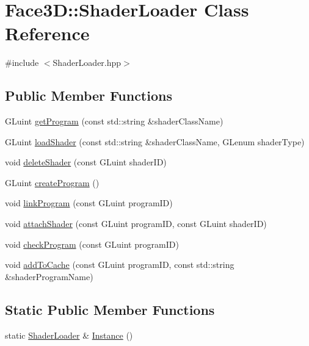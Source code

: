\hypertarget{class_face3_d_1_1_shader_loader}{}\section{Face3D\+:\+:Shader\+Loader Class Reference}
\label{class_face3_d_1_1_shader_loader}


{\ttfamily \#include $<$Shader\+Loader.\+hpp$>$}

\subsection*{Public Member Functions}
\begin{DoxyCompactItemize}
\item 
G\+Luint \hyperlink{class_face3_d_1_1_shader_loader_a4091dd965bb5ea248179037bf5ff78de}{get\+Program} (const std\+::string \&shader\+Class\+Name)
\item 
G\+Luint \hyperlink{class_face3_d_1_1_shader_loader_adc8a9f009531395a7f3799282f37e4af}{load\+Shader} (const std\+::string \&shader\+Class\+Name, G\+Lenum shader\+Type)
\item 
void \hyperlink{class_face3_d_1_1_shader_loader_ac239e9bba960ea43d26af1e9c8acd891}{delete\+Shader} (const G\+Luint shader\+ID)
\item 
G\+Luint \hyperlink{class_face3_d_1_1_shader_loader_a1c86dcd82b5e7dde836854423749d281}{create\+Program} ()
\item 
void \hyperlink{class_face3_d_1_1_shader_loader_a968155ebb8821b63b391ae65479b53f4}{link\+Program} (const G\+Luint program\+ID)
\item 
void \hyperlink{class_face3_d_1_1_shader_loader_ab0b54e024b6fe4ca52e3cf2cc122fdea}{attach\+Shader} (const G\+Luint program\+ID, const G\+Luint shader\+ID)
\item 
void \hyperlink{class_face3_d_1_1_shader_loader_a01cc11dfddbe0afa70ec2ebd78c7dde2}{check\+Program} (const G\+Luint program\+ID)
\item 
void \hyperlink{class_face3_d_1_1_shader_loader_ad688d7d2ba116947d5ff286e4810c62f}{add\+To\+Cache} (const G\+Luint program\+ID, const std\+::string \&shader\+Program\+Name)
\end{DoxyCompactItemize}
\subsection*{Static Public Member Functions}
\begin{DoxyCompactItemize}
\item 
static \hyperlink{class_face3_d_1_1_shader_loader}{Shader\+Loader} \& \hyperlink{class_face3_d_1_1_shader_loader_a903512f7a8cfd41c480f088e50fb1287}{Instance} ()
\end{DoxyCompactItemize}
